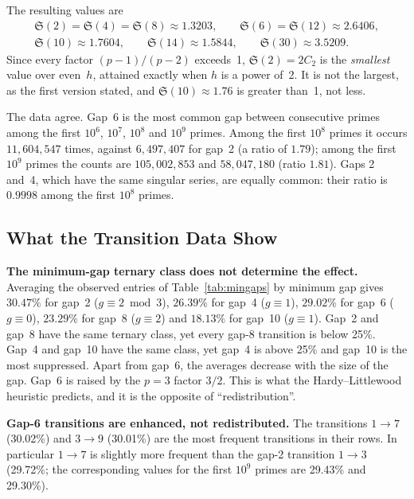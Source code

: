 \documentclass[12pt,a4paper]{article}
\theoremstyle{plain}
\theoremstyle{definition}
\theoremstyle{remark}
\begin{document}
The resulting values are
\begin{gather*}
  \mathfrak{S}(2) = \mathfrak{S}(4) = \mathfrak{S}(8) \approx 1.3203, \qquad
  \mathfrak{S}(6) = \mathfrak{S}(12) \approx 2.6406, \\
  \mathfrak{S}(10) \approx 1.7604, \qquad
  \mathfrak{S}(14) \approx 1.5844, \qquad
  \mathfrak{S}(30) \approx 3.5209 .
\end{gather*}
Since every factor $(p-1)/(p-2)$ exceeds~1, $\mathfrak{S}(2) = 2C_2$ is the
\emph{smallest} value over even~$h$, attained exactly when $h$ is a power of~2. It is
not the largest, as the first version stated, and $\mathfrak{S}(10) \approx 1.76$ is
greater than~1, not less.

The data agree. Gap~6 is the most common gap between consecutive primes among the
first $10^6$, $10^7$, $10^8$ and $10^9$ primes. Among the first $10^8$ primes it occurs
$11{,}604{,}547$ times, against $6{,}497{,}407$ for gap~2 (a ratio of $1.79$); among the
first $10^9$ primes the counts are $105{,}002{,}853$ and $58{,}047{,}180$ (ratio $1.81$).
Gaps 2 and~4, which have the same singular series, are equally common: their ratio is
$0.9998$ among the first $10^8$ primes.

\subsection{What the Transition Data Show}
\label{sec:data}

\noindent\textbf{The minimum-gap ternary class does not determine the effect.}
Averaging the observed entries of Table~\ref{tab:mingaps} by minimum gap gives
$30.47\%$ for gap~2 ($g \equiv 2 \bmod 3$), $26.39\%$ for gap~4 ($g \equiv 1$),
$29.02\%$ for gap~6 ($g \equiv 0$), $23.29\%$ for gap~8 ($g \equiv 2$) and $18.13\%$
for gap~10 ($g \equiv 1$). Gap~2 and gap~8 have the same ternary class, yet every
gap-8 transition is below 25\%. Gap~4 and gap~10 have the same class, yet gap~4 is
above 25\% and gap~10 is the most suppressed. Apart from gap~6, the averages decrease
with the size of the gap. Gap~6 is raised by the $p = 3$ factor $3/2$. This is what the
Hardy--Littlewood heuristic predicts, and it is the opposite of ``redistribution''.

\medskip
\noindent\textbf{Gap-6 transitions are enhanced, not redistributed.} The transitions
$1 \to 7$ (30.02\%) and $3 \to 9$ (30.01\%) are the most frequent transitions in their
rows. In particular $1 \to 7$ is slightly more frequent than the gap-2 transition
$1 \to 3$ (29.72\%; the corresponding values for the first $10^9$ primes are 29.43\%
and 29.30\%).
\end{document}
